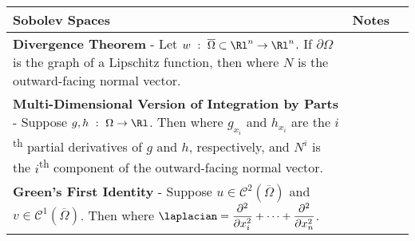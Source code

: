 \begin{longtable}{|*{3}{>{\centering\arraybackslash}p{}|}}
    \toprule
        \textbf{Sobolev Spaces} & \textbf{Notes} \\[6pt]
        \midrule
        \endhead
            \textbf{Divergence Theorem} - Let $w\ :\ \overline{\Omega} \subset \Rl^n \rightarrow \Rl^n$.  If $\partial\Omega$ is the graph of a Lipschitz function, then \newline {$\!\begin{gathered} \int_\Omega \div w \dd x = \int_{\partial \Omega} w \cdot N \dd S \end{gathered}$} \newline where $N$ is the outward-facing normal vector.
            &
            
            \\[6pt] \hline
            
            \textbf{Multi-Dimensional Version of Integration by Parts} - Suppose $g,h\ :\ \Omega \rightarrow \Rl$.  Then \newline {$\!\begin{gathered} \int_\Omega g h_{x_i} \dd x = \int_{\partial\Omega} gh N^i \dd S - \int_\Omega g_{x_i}h \dd x \end{gathered}$} \newline where $g_{x_i}$ and $h_{x_i}$ are the $i$\textsuperscript{th} partial derivatives of $g$ and $h$, respectively, and $N^i$ is the $i$\textsuperscript{th} component of the outward-facing normal vector.
            &
            
            \\[6pt] \hline
            
            \textbf{Green's First Identity} - Suppose $u \in \mathcal{C}^2(\overline{\Omega})$ and $v \in \mathcal{C}^1(\overline{\Omega})$.  Then \newline {$\!\begin{gathered} \int_\Omega \grad v \cdot \grad u \dd x + \int_\Omega v \laplacian u \dd x = \int_\Omega \div\qty(v\grad u) \dd x \\ \ \ \ \qquad\qquad\qquad\qquad\qquad = \int_{\partial\Omega} v \frac{\partial u}{\partial N}\dd X. \end{gathered}$} \newline where $\laplacian = \dfrac{\partial^2}{\partial x_i^2} + \dots + \dfrac{\partial^2}{\partial x_n^2}$.
            &
            
            \\[6pt] \hline
            

\end{longtable}
